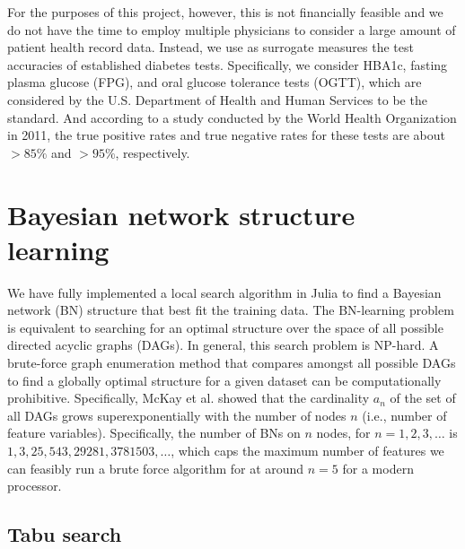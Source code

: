 \documentclass[11pt]{article}
\begin{document}
For the purposes of this project, however, this is not financially feasible and we do not have the time to employ multiple physicians to consider a large amount of patient health record data. Instead, we use as surrogate measures the test accuracies of established diabetes tests. Specifically, we consider HBA1c, fasting plasma glucose (FPG), and oral glucose tolerance tests (OGTT), which are considered by the U.S. Department of Health and Human Services to be the standard. And according to a study conducted by the World Health Organization in 2011, the true positive rates and true negative rates for these tests are about $>85\%$ and $>95\%$, respectively. 

\section{Bayesian network structure learning}

We have fully implemented a local search algorithm in Julia to find a Bayesian network (BN) structure that best fit the training data. The BN-learning problem is equivalent to searching for an optimal structure over the space of all possible directed acyclic graphs (DAGs). In general, this search problem is NP-hard. A brute-force graph enumeration method that compares amongst all possible DAGs to find a globally optimal structure for a given dataset can be computationally prohibitive. Specifically, McKay et al. \cite{McK:04} showed that the cardinality $a_{n}$ of the set of all DAGs grows superexponentially with the number of nodes $n$ (i.e., number of feature variables). Specifically, the number of BNs on $n$ nodes, for $n = 1, 2, 3, \ldots$ is $1, 3, 25, 543, 29281, 3781503, \ldots$, which caps the maximum number of features we can feasibly run a brute force algorithm for at around $n = 5$ for a modern processor.

\subsection{Tabu search}
\end{document}
